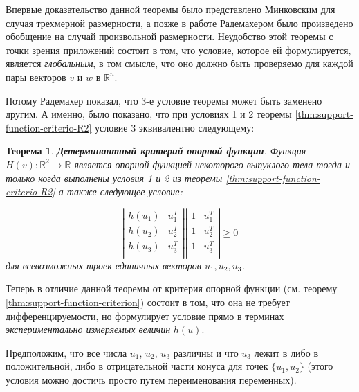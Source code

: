 \documentclass[a4paper, 12pt, titlepage]{article}
\theoremstyle{definition}
\theoremstyle{plain}
\newtheorem{SmartTheorem}{Теорема}
\theoremstyle{plain}
\begin{document}
Впервые доказательство данной теоремы было представлено Минковским для случая
трехмерной размерности, а позже в работе \cite{journals/mz/Rademacher22}
Радемахером было произведено обобщение на случай произвольной размерности.
Неудобство этой теоремы с точки зрения приложений состоит в том, что условие,
которое ей формулируется, является \textit{глобальным}, в том смысле, что оно
должно быть проверяемо для каждой пары векторов $v$ и $w$ в $\mathbb{R}^{n}$.

Потому Радемахер показал, что 3-е условие теоремы может быть заменено другим.
А именно, было показано, что при условиях 1 и 2 теоремы
\ref{thm:support-function-criterio-R2} условие 3 эквивалентно следующему:

\begin{SmartTheorem}
 \label{thm:support-function-criterio-R2-det}
 \textbf{Детерминантный критерий опорной функции}.
 Функция $H(v): \mathbb{R}^{2} \to \mathbb{R}$ является опорной функцией
 некоторого выпуклого тела тогда и только когда выполнены условия 1 и 2 из
 теоремы \ref{thm:support-function-criterio-R2} а также следующее условие:

\begin{equation}
 \left|\begin{array}{cc}
  h(u_{1}) & u_{1}^{T} \\
  h(u_{2}) & u_{2}^{T} \\
  h(u_{3}) & u_{3}^{T} \\
 \end{array}\right|
  \left|\begin{array}{cc}
  1 & u_{1}^{T} \\
  1 & u_{2}^{T} \\
  1 & u_{3}^{T} \\
 \end{array}\right|
 \geq 0
\end{equation}
для всевозможных троек единичных векторов $u_{1}, u_{2}, u_{3}$.
\end{SmartTheorem}

Теперь в отличие данной теоремы от критерия опорной функции (см. теорему
\ref{thm:support-function-criterion}) состоит в том, что она не требует
дифференцируемости, но формулирует условие прямо в терминах
\textit{экспериментально измеряемых величин} $h(u)$.

Предположим, что все числа $u_{1}$, $u_{2}$, $u_{3}$ различны и что $u_{3}$
лежит в либо в положительной, либо в отрицательной части конуса для точек
$\{u_{1}, u_{2}\}$ (этого условия можно достичь просто путем переименования
переменных).
\end{document}
